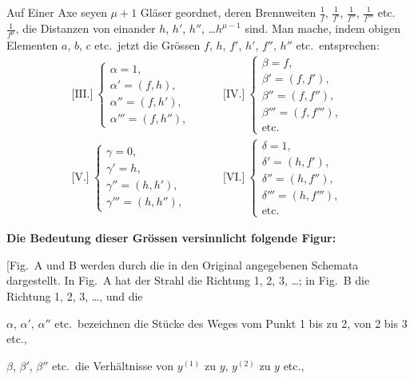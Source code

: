 \documentclass[12pt,a4paper]{article}
\theoremstyle{plain}
\theoremstyle{definition}
\theoremstyle{remark}
\begin{document}
Auf Einer Axe seyen $\mu + 1$ Gl\"aser geordnet, deren Brennweiten
$\frac{1}{f}$, $\frac{1}{f'}$, $\frac{1}{f''}$,
$\frac{1}{f'''}$ etc.~$\frac{1}{f^{\mu}}$, die Distanzen von
einander $h$, $h'$, $h''$, \ldots $h^{\mu-1}$ sind. Man mache,
indem obigen Elementen $a$, $b$, $c$ etc.~jetzt die Gr\"ossen $f$,
$h$, $f'$, $h'$, $f''$, $h''$ etc.~entsprechen:
\[
\begin{array}{ll}
\text{[III.]}\ \left\{\begin{array}{l}
\alpha = 1,\\
\alpha' = (f,h),\\
\alpha'' = (f,h'),\\
\alpha''' = (f,h''),\end{array}\right.\qquad
&
\text{[IV.]}\ \left\{\begin{array}{l}
\beta = f,\\
\beta' = (f,f'),\\
\beta'' = (f,f''),\\
\beta''' = (f,f'''),\\
\text{etc.}\end{array}\right.\\[2ex]
\text{[V.]}\ \left\{\begin{array}{l}
\gamma = 0,\\
\gamma' = h,\\
\gamma'' = (h,h'),\\
\gamma''' = (h,h''),\end{array}\right.\qquad
&
\text{[VI.]}\ \left\{\begin{array}{l}
\delta = 1,\\
\delta' = (h,f'),\\
\delta'' = (h,f''),\\
\delta''' = (h,f'''),\\
\text{etc.}\end{array}\right.
\end{array}
\]

\textbf{Die Bedeutung dieser Gr\"ossen versinnlicht folgende Figur:}

\medskip

[Fig.~A und B werden durch die in den Original angegebenen Schemata
dargestellt. In Fig.~A hat der Strahl die Richtung 1, 2, 3, \ldots;
in Fig.~B die Richtung 1, 2, 3, \ldots, und die\vspace{-3pt}

$\alpha$, $\alpha'$, $\alpha''$ etc.\ bezeichnen die St\"ucke des Weges
vom Punkt 1 bis zu 2, von 2 bis 3 etc.,

$\beta$, $\beta'$, $\beta''$ etc.\ die Verh\"altnisse von $y^{(1)}$ zu $y$,
$y^{(2)}$ zu $y$ etc.,
\end{document}
